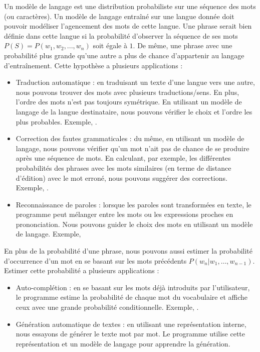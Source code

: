 \documentclass{KodeBook}
\begin{document}
Un modèle de langage est une distribution probabiliste sur une séquence des mots (ou caractères).
Un modèle de langage entraîné sur une langue donnée doit pouvoir modéliser l'agencement des mots de cette langue.
Une phrase serait bien définie dans cette langue si la probabilité d'observer la séquence de ses mots $P(S) = P(w_1, w_2, ..., w_n) $ soit égale à $1$. 
De même, une phrase avec une probabilité plus grande qu'une autre a plus de chance d'appartenir au langage d'entraînement.
Cette hypothèse a plusieurs applications : 
\begin{itemize}
	\item Traduction automatique : en traduisant un texte d'une langue vers une autre, nous pouvons trouver des mots avec plusieurs traductions/sens. 
	En plus, l'ordre des mots n'est pas toujours symétrique. 
	En utilisant un modèle de langage de la langue destinataire, nous pouvons vérifier le choix et l'ordre les plus probables. 
	Exemple, 
	.
	
	\item Correction des fautes grammaticales : du même, en utilisant un modèle de langage, nous pouvons vérifier qu'un mot n'ait pas de chance de se produire après une séquence de mots. 
	En calculant, par exemple, les différentes probabilités des phrases avec les mots similaires (en terme de distance d'édition) avec le mot erroné, nous pouvons suggérer des corrections.
	Exemple, .
	
	\item Reconnaissance de paroles : lorsque les paroles sont transformées en texte, le programme peut mélanger entre les mots ou les expressions proches en prononciation. 
	Nous pouvons guider le choix des mots en utilisant un modèle de langage.
	Exemple, 
\end{itemize}
%
En plus de la probabilité d'une phrase, nous pouvons aussi estimer la probabilité d'occurrence d'un mot en se basant sur les mots précédents $P(w_n | w_1, \ldots, w_{n-1}) $. 
Estimer cette probabilité a plusieurs applications :
\begin{itemize}
	\item Auto-complétion : en se basant sur les mots déjà introduits par l'utilisateur, le programme estime la probabilité de chaque mot du vocabulaire et affiche ceux avec une grande probabilité conditionnelle.
	Exemple, .
	
	\item Génération automatique de textes : en utilisant une représentation interne, nous essayons de générer le texte mot par mot. 
	Le programme utilise cette représentation et un modèle de langage pour apprendre la génération.
\end{itemize}
\end{document}
